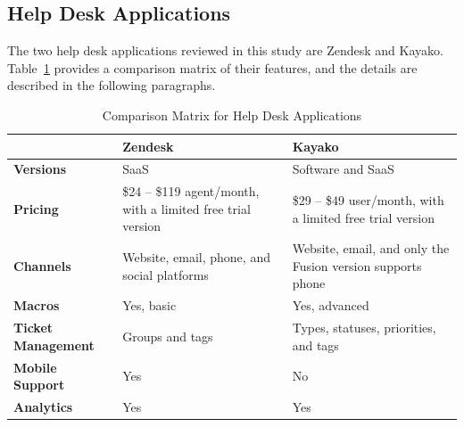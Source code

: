 \subsection{Help Desk Applications}
\label{subsec:3.3.2:HelpDeskAppl}

The two help desk applications reviewed in this study are Zendesk and Kayako. Table~\ref{tab:comp_matr_help} provides a comparison matrix of their features, and the details are described in the following paragraphs.

\clearpage

\begin{table}[H]
\begin{center}
	\caption[Comparison Matrix for Help Desk Applications]{Comparison Matrix for Help Desk Applications} \label{tab:comp_matr_help}
    \begin{tabular}{ | p{3cm} | p{5cm} | p{5cm} | }
	\hline
	& \textbf{Zendesk} & \textbf{Kayako} \\ \hline
	\textbf{Versions} & SaaS & Software and SaaS \\ \hline
	\textbf{Pricing} & \$24 -- \$119 agent/month, with a limited free trial version & \$29 -- \$49 user/month, with a limited free trial version \\ \hline
	\textbf{Channels} & Website, email, phone, and social platforms & Website, email, and only the Fusion version supports phone \\ \hline
	\textbf{Macros} & Yes, basic & Yes, advanced \\ \hline
	\textbf{Ticket Management} & Groups and tags & Types, statuses, priorities, and tags \\ \hline
	\textbf{Mobile Support} & Yes & No \\ \hline
	\textbf{Analytics} & Yes & Yes \\ \hline
    \end{tabular}
\end{center}
\end{table}

